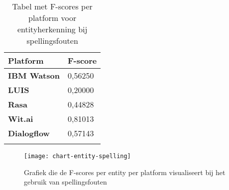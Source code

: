 \begin{center}
    \begin{longtable}{| l | l |}
        \hline
        \textbf{Platform} & \textbf{F-score} \\ \hline
        \textbf{IBM Watson} & 0,56250 \\ \hline  
        \textbf{LUIS} & 0,20000 \\ \hline  
        \textbf{Rasa} & 0,44828 \\ \hline  
        \textbf{Wit.ai} & 0,81013  \\ \hline  
        \textbf{Dialogflow} & 0,57143 \\ \hline  
        \caption{Tabel met F-scores per platform voor entityherkenning bij spellingsfouten}                                    
    \end{longtable}
    \label{tbl:results-entity-spelling}
\end{center}

\begin{figure}[H]
    \label{fig:chart-entity-spelling}
    \centering
    \texttt{[image: chart-entity-spelling]}
    \caption{Grafiek die de F-scores per entity per platform visualiseert bij het gebruik van spellingsfouten}
\end{figure}














